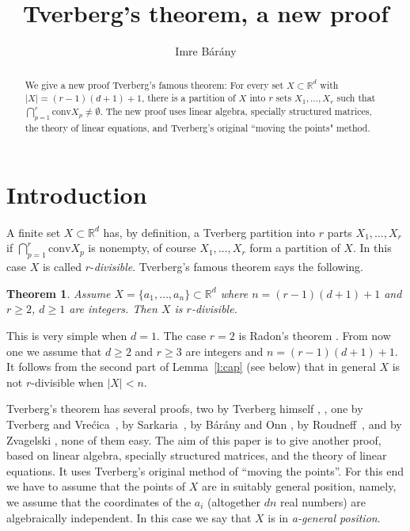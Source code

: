 \documentclass[12pt,a4paper]{amsart}
\newtheorem{theorem}{Theorem}[section]
\newcommand{\R}{\mathbb{R}}
\newcommand{\conv}{\mathrm{conv}}
\numberwithin{equation}{section}
\begin{document}
\title{Tverberg's theorem, a new proof}
\author{Imre B\'ar\'any}

\begin{abstract} We give a new proof Tverberg's famous theorem: For every set $X \subset \R^d$ with $|X|=(r-1)(d+1)+1$, there is a partition of $X$ into $r$ sets $X_1,\ldots,X_r$ such that $\bigcap_{p=1}^r \conv X_p\ne \emptyset$. The new proof uses linear algebra, specially structured matrices, the theory of linear equations, and Tverberg's original ``moving the points" method.
\end{abstract}

\maketitle

\section{Introduction}\label{sec:introd}


A finite set $X \subset \R^d$ has, by definition, a Tverberg partition into $r$ parts $X_1,\ldots,X_r$ if $\bigcap_{p=1}^r \conv X_p$ is nonempty, of course $X_1,\ldots,X_r$ form a partition of $X$. In this case $X$ is called $r$-{\sl divisible}. Tverberg's famous theorem \cite{tv} says the following.

\begin{theorem}\label{th:Tv} Assume $X=\{a_1,\ldots,a_n\}\subset \R^d$ where $n=(r-1)(d+1)+1$ and $r\ge 2$, $d\ge 1$ are integers. Then $X$ is $r$-divisible.
\end{theorem}

This is very simple when $d=1$. The case $r=2$ is Radon's theorem \cite{Rad}. From now one we assume that $d \ge 2$ and $r\ge 3$ are integers and $n=(r-1)(d+1)+1$.  It follows from the second part of Lemma~\ref{l:cap} (see below) that in general $X$ is not $r$-divisible when $|X|<n$.

\smallskip
Tverberg's theorem has several proofs, two by Tverberg himself \cite{tv}, \cite{tv81}, one by Tverberg and Vre\'cica~\cite{TvVrec}, by Sarkaria~\cite{Sar}, by B\'ar\'any and Onn \cite{BarOnn}, by Roudneff~\cite{Roud}, and by Zvagelski \cite{Zva}, none of them easy. The aim of this paper is to give another proof, based on linear algebra, specially structured matrices, and the theory of linear equations. It uses Tverberg's original method of ``moving the points''. For this end we have to assume that the points of $X$ are in suitably general position, namely, we assume that the coordinates of the $a_i$ (altogether $dn$ real numbers) are algebraically independent. In this case we say that $X$ is in {\sl a-general position}.
\end{document}
